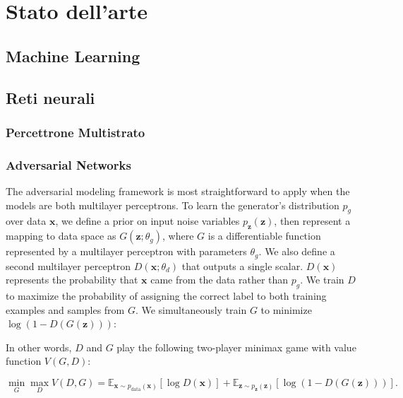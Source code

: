 \chapter{Stato dell'arte}
\label{statodellarte}

\newpage
\section{Machine Learning}

\newpage
\section{Reti neurali}

\subsection{Percettrone Multistrato}
\subsection{Adversarial Networks}
The adversarial modeling framework is most straightforward to apply when the models are both multilayer perceptrons. To learn the generator's distribution $p_g$ over data $\bm{x}$, we
define a prior on input noise variables $p_{\bm{z}}(\bm{z})$, then represent a
mapping to data space as $G(\bm{z}; \theta_g)$, where $G$ is a differentiable function
represented by a multilayer perceptron with parameters $\theta_g$. We also define a second
multilayer perceptron $D(\bm{x}; \theta_d)$ that outputs a single scalar. $D(\bm{x})$ represents
the probability that $\bm{x}$ came from the data rather than $p_g$. We train $D$ to maximize the
probability of assigning the correct label to both training examples and samples from $G$.
We simultaneously train $G$ to minimize $\log(1-D(G(\bm{z})))$:

In other words, $D$ and $G$ play the following two-player minimax game with value function $V(G, D)$: 

\begin{equation}
\label{eq:minimaxgame-definition}
\min_G \max_D V(D, G) = \mathbb{E}_{\bm{x} \sim p_{\text{data}}(\bm{x})}[\log D(\bm{x})] + \mathbb{E}_{\bm{z} \sim p_{\bm{z}}(\bm{z})}[\log (1 - D(G(\bm{z})))].
\end{equation}


